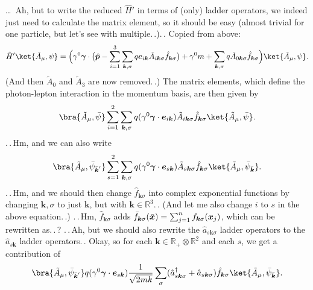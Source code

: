 \documentclass{report}
\begin{document}
\ldots\ Ah, but to write the reduced $\hat H'$ in terms of (only) ladder operators, we indeed just need to calculate the matrix element, so it should be easy (almost trivial for one particle, but let's see with multiple.\,.).\,.  Copied from above:
\begin{align}
	\hat H' \ket{\tilde A_\mu, \psi} = 
		\Big(
			\gamma^0 \boldsymbol \gamma \cdot \big(
				\hat{\boldsymbol p\,}\! - 
					\sum_{i=1}^{3} \sum_{\boldsymbol{k}, \sigma}
					q\boldsymbol{e}_{i\boldsymbol{k}} 
					\tilde A_{i\boldsymbol{k}\sigma}
					\hat f_{\boldsymbol{k}\sigma}
			\big) +
			\gamma^0 m + 
			\sum_{\boldsymbol{k}, \sigma}
			q\tilde A_{0\boldsymbol{k}\sigma}
			\hat f_{\boldsymbol{k}\sigma}
		\Big)
		\ket{\tilde A_\mu, \psi}.
\end{align}
(And then $\tilde A_0$ and $\tilde A_3$ are now removed.\,.) The matrix elements, which define the photon-lepton interaction in the momentum basis, are then given by
\begin{align}
	\bra{\tilde A_\mu, \bar\psi} 
		\sum_{i=1}^{2} \sum_{\boldsymbol{k}, \sigma}
		q(\gamma^0\boldsymbol\gamma \cdot \boldsymbol{e}_{i\boldsymbol{k}})
		\tilde A_{i\boldsymbol{k}\sigma}
		\hat f_{\boldsymbol{k}\sigma}
	\ket{\tilde A_\mu, \bar\psi}.
\end{align}
.\,.\,Hm, and we can also write
\begin{align}
	\bra{\tilde A_\mu, \bar\psi_{\bar{\boldsymbol{k}}'}} 
		\sum_{s=1}^{2} \sum_{\boldsymbol{k}, \sigma}
		q(\gamma^0\boldsymbol\gamma \cdot \boldsymbol{e}_{s\boldsymbol{k}})
		\tilde A_{s\boldsymbol{k}\sigma}
		\hat f_{\boldsymbol{k}\sigma}
	\ket{\tilde A_\mu, \bar\psi_{\bar{\boldsymbol{k}}}}.
\end{align}
.\,.\,Hm, and we should then change $\hat f_{\boldsymbol{k}\sigma}$ into complex exponential functions by changing $\boldsymbol{k}, \sigma$ to just $\boldsymbol{k}$, but with $\boldsymbol{k}\in \mathbb{R}^3$.\,. (And let me also change $i$ to $s$ in the above equation.\,.) .\,.\,Hm, $\hat f_{\boldsymbol{k}\sigma}$ adds
$\bar f_{\boldsymbol{k} \sigma}(\bar{\boldsymbol{x}\hspace{.05em}}\hspace{-.05em}) = 
\sum_{j=1}^n f_{\boldsymbol{k} \sigma}(\boldsymbol{x}_j)$, which can be rewritten as.\,.\,? .\,.\,Ah, but we should also rewrite the $\hat a_{s\boldsymbol{k}\sigma}$ ladder operators to the $\hat a_{s\boldsymbol{k}}$ ladder operators.\,. Okay, so for each $\boldsymbol{k}\in \mathbb{R}_+\otimes \mathbb{R}^2$ and each $s$, we get a contribution of
\begin{align}
	\bra{\tilde A_\mu, \bar\psi_{\bar{\boldsymbol{k}}'}} 
		q(\gamma^0\boldsymbol\gamma \cdot \boldsymbol{e}_{s\boldsymbol{k}})
		\frac{1}{\sqrt{2mk}} 
		\sum_{\sigma}
		(\hat a_{s\boldsymbol{k}\sigma}^\dagger + \hat a_{s\boldsymbol{k}\sigma})
		\hat f_{\boldsymbol{k}\sigma}
	\ket{\tilde A_\mu, \bar\psi_{\bar{\boldsymbol{k}}}}.
\end{align}
\end{document}
